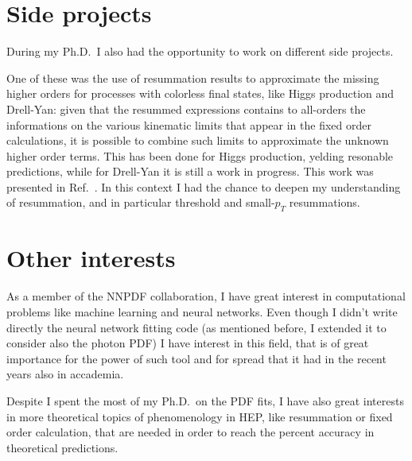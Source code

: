 \documentclass[11pt,a4paper]{moderncv}        %
\begin{document}
\section{Side projects}

During my Ph.D.\ I also had the opportunity to work on different side projects.

One of these was the use of resummation results to approximate the missing higher orders for processes with colorless final states,
like Higgs production and Drell-Yan:
given that the resummed expressions
contains to all-orders the informations on the various kinematic limits that appear in the fixed order calculations, it is possible
to combine such limits to approximate the unknown higher order terms.
This has been done for Higgs production, yelding resonable predictions, while for Drell-Yan it is still a work in progress.
This work was presented in Ref.~\cite{laurenti2022approximating}.
In this context I had the chance to deepen my understanding of resummation, and in particular threshold and small-$p_T$ resummations.

\section{Other interests}

As a member of the NNPDF collaboration, I have great interest
in computational problems like machine learning and neural networks.
Even though I didn't write directly the neural network fitting code (as mentioned before, I extended it to consider also the photon PDF)
I have interest in this field, that is of great importance for the power of such tool and for spread that it had in the recent years
also in accademia.

Despite I spent the most of my Ph.D.\ on the PDF fits, I have also great interests in more theoretical topics of phenomenology in HEP,
like resummation or fixed order calculation, that are needed in order to reach the percent accuracy in theoretical predictions.



\end{document}
